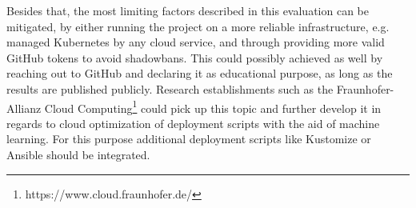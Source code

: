 Besides that, the most limiting factors described in this evaluation can be mitigated, by either running the project on a more reliable infrastructure, e.g. managed Kubernetes by any cloud service, and through providing more valid GitHub tokens to avoid shadowbans. This could possibly achieved as well by reaching out to GitHub and declaring it as educational purpose, as long as the results are published publicly.
Research establishments such as the Fraunhofer-Allianz Cloud Computing\footnote{https://www.cloud.fraunhofer.de/} could pick up this topic and further develop it in regards to cloud optimization of deployment scripts with the aid of machine learning. For this purpose additional deployment scripts like Kustomize or Ansible should be integrated.




